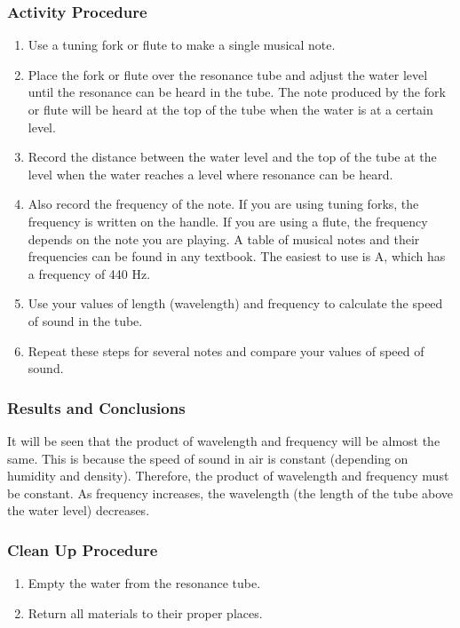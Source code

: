 \subsubsection*{Activity Procedure}
\begin{enumerate}
\item{Use a tuning fork or flute to make a single musical note.} 
\item{Place the fork or flute over the resonance tube and adjust the water level until the resonance can be heard in the tube. The note produced by the fork or flute will be heard at the top of the tube when the water is at a certain level.} 
\item{Record the distance between the water level and the top of the tube at the level when the water reaches a level where resonance can be heard.} 
\item{Also record the frequency of the note. If you are using tuning forks, the frequency is written on the handle. If you are using a flute, the frequency depends on the note you are playing. A table of musical notes and their frequencies can be found in any textbook. The easiest to use is A, which has a frequency of 440 Hz.} 
\item{Use your values of length (wavelength) and frequency to calculate the speed of sound in the tube.} 
\item{Repeat these steps for several notes and compare your values of speed of sound.} 
\end{enumerate}

\subsubsection*{Results and Conclusions}
It will be seen that the product of wavelength and frequency will be almost the same. This is because the speed of sound in air is constant (depending on humidity and density). Therefore, the product of wavelength and frequency must be constant. As frequency increases, the wavelength (the length of the tube above the water level) decreases.  

\subsubsection*{Clean Up Procedure}
\begin{enumerate}
\item{Empty the water from the resonance tube.} 
\item{Return all materials to their proper places.} 
\end{enumerate}

